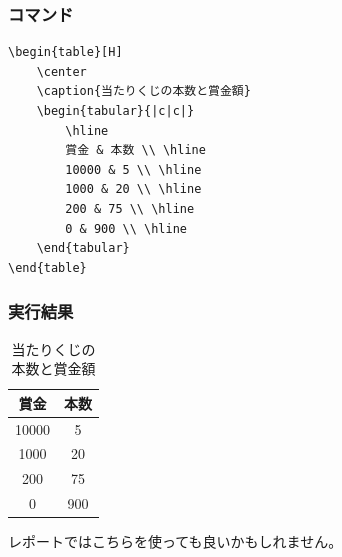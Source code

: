 \documentclass[a4j, titlepage]{jarticle}
\begin{document}
\begin{multicols}{2}

\subsubsection*{コマンド}
\begin{lstlisting}
\begin{table}[H]
    \center
    \caption{当たりくじの本数と賞金額}
    \begin{tabular}{|c|c|}
        \hline
        賞金 & 本数 \\ \hline
        10000 & 5 \\ \hline
        1000 & 20 \\ \hline
        200 & 75 \\ \hline
        0 & 900 \\ \hline
    \end{tabular}
\end{table}
\end{lstlisting}

\vfill\null
\columnbreak

\subsubsection*{実行結果}
\begin{screen}

    \begin{table}[H]
        \center
        \caption{当たりくじの本数と賞金額}
        \begin{tabular}{|c|c|}
            \hline
            賞金 & 本数 \\ \hline
            10000 & 5 \\ \hline
            1000 & 20 \\ \hline
            200 & 75 \\ \hline
            0 & 900 \\ \hline
        \end{tabular}
    \end{table}

\end{screen}
\end{multicols}

レポートではこちらを使っても良いかもしれません。
\end{document}
